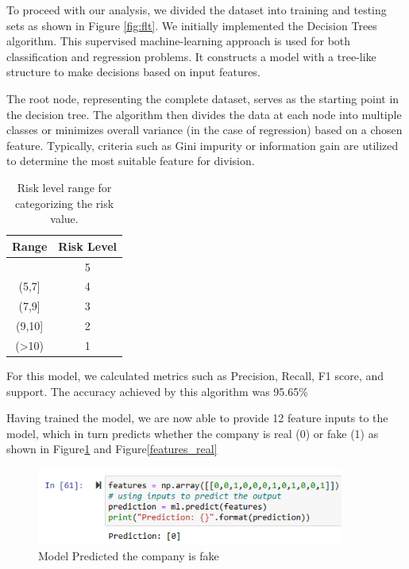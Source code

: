 \documentclass{article}
\begin{document}
To proceed with our analysis, we divided the dataset into training and testing sets as shown in Figure \ref{fig:flt}.
We initially implemented the Decision Trees algorithm. This supervised machine-learning approach is used for both classification and regression problems. It constructs a model with a tree-like structure to make decisions based on input features.

The root node, representing the complete dataset, serves as the starting point in the decision tree. The algorithm then divides the data at each node into multiple classes or minimizes overall variance (in the case of regression) based on a chosen feature. Typically, criteria such as Gini impurity or information gain are utilized to determine the most suitable feature for division.
\begin{table}[]
\begin{center}
\caption{Risk level range for categorizing the risk value.}\label{range}
\begin{tabular}{|c|c|}

\hline
 Range & Risk Level \\ \hline
 [0,5]& 5 \\ \hline
(5,7] & 4 \\ \hline
(7,9] & 3 \\ \hline
(9,10] & 2 \\ \hline
(>10) &  1\\ \hline
\end{tabular}
\end{center}
\end{table}
For this model, we calculated metrics such as Precision, Recall, F1 score, and support. The accuracy achieved by this algorithm was 95.65\% 

Having trained the model, we are now able to provide 12 feature inputs to the model, which in turn predicts whether the company is real (0) or fake (1) as shown in Figure\ref{features_fake} and Figure\ref{features_real}

\begin{figure}[h]%
\centering

\includegraphics[width=0.9\textwidth]{features.png}
\caption{Model Predicted the company is fake}\label{features_fake}
\end{figure}
\end{document}
